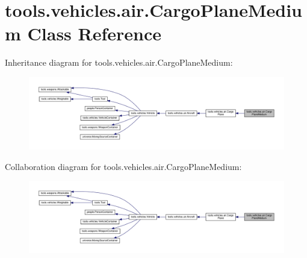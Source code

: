 \hypertarget{classtools_1_1vehicles_1_1air_1_1_cargo_plane_medium}{}\section{tools.\+vehicles.\+air.\+Cargo\+Plane\+Medium Class Reference}
\label{classtools_1_1vehicles_1_1air_1_1_cargo_plane_medium}


Inheritance diagram for tools.\+vehicles.\+air.\+Cargo\+Plane\+Medium\+:
\nopagebreak
\begin{figure}[H]
\begin{center}
\leavevmode
\includegraphics[width=350pt]{classtools_1_1vehicles_1_1air_1_1_cargo_plane_medium__inherit__graph}
\end{center}
\end{figure}


Collaboration diagram for tools.\+vehicles.\+air.\+Cargo\+Plane\+Medium\+:
\nopagebreak
\begin{figure}[H]
\begin{center}
\leavevmode
\includegraphics[width=350pt]{classtools_1_1vehicles_1_1air_1_1_cargo_plane_medium__coll__graph}
\end{center}
\end{figure}
